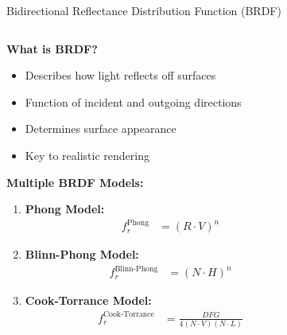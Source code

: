 \documentclass[aspectratio=169]{beamer}
\begin{document}
\begin{frame}{Bidirectional Reflectance Distribution Function (BRDF)}
    \begin{columns}
        \begin{column}{0.5\textwidth}
            \textbf{What is BRDF?}
            \begin{itemize}
                \item<1-> Describes how light reflects off surfaces
                \item<2-> Function of incident and outgoing directions
                \item<3-> Determines surface appearance
                \item<4-> Key to realistic rendering
            \end{itemize}
            
            \vspace{0.5cm}
            \textbf{Multiple BRDF Models:}
            \begin{enumerate}
                \item<1-> \textbf{Phong Model:}
                \begin{align}
                    f_r^{\text{Phong}} &= (R \cdot V)^n
                \end{align}
                \item<2-> \textbf{Blinn-Phong Model:}
                \begin{align}
                    f_r^{\text{Blinn-Phong}} &= (N \cdot H)^n
                \end{align}
                \item<3-> \textbf{Cook-Torrance Model:}
                \begin{align}
                    f_r^{\text{Cook-Torrance}} &= \frac{DFG}{4(N \cdot V)(N \cdot L)}
                \end{align}
            \end{enumerate}
        \end{column}
        \begin{column}{0.5\textwidth}
\end{column}
\end{columns}
\end{frame}
\end{document}
